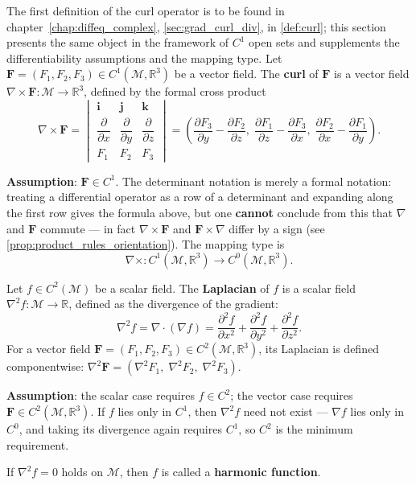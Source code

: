 \begin{definition}[Curl]\label{def:curl_vf}
The first definition of the curl operator is to be found in chapter~\ref{chap:diffeq_complex}, \cref{sec:grad_curl_div}, in \cref{def:curl}; this section presents the same object in the framework of $C^1$ open sets and supplements the differentiability assumptions and the mapping type.
Let $\mathbf{F} = (F_1, F_2, F_3) \in C^1(\mathcal{M}, \mathbb{R}^3)$ be a vector field. The \textbf{curl} of $\mathbf{F}$ is a vector field $\nabla \times \mathbf{F}: \mathcal{M} \to \mathbb{R}^3$, defined by the formal cross product
\[
\nabla \times \mathbf{F} = \begin{vmatrix}
\mathbf{i} & \mathbf{j} & \mathbf{k} \\[2pt]
\dfrac{\partial}{\partial x} & \dfrac{\partial}{\partial y} & \dfrac{\partial}{\partial z} \\[6pt]
F_1 & F_2 & F_3
\end{vmatrix}
= \left( \frac{\partial F_3}{\partial y} - \frac{\partial F_2}{\partial z},\;
\frac{\partial F_1}{\partial z} - \frac{\partial F_3}{\partial x},\;
\frac{\partial F_2}{\partial x} - \frac{\partial F_1}{\partial y} \right).
\]

\textbf{Assumption}: $\mathbf F\in C^1$. The determinant notation is merely a formal notation: treating a differential operator as a row of a determinant and expanding along the first row gives the formula above, but one \textbf{cannot} conclude from this that $\nabla$ and $\mathbf F$ commute --- in fact $\nabla\times\mathbf F$ and $\mathbf F\times\nabla$ differ by a sign (see \cref{prop:product_rules_orientation}). The mapping type is
\[
\nabla\times: C^1(\mathcal{M}, \mathbb{R}^3) \to C^0(\mathcal{M}, \mathbb{R}^3).
\]
\end{definition}

\begin{definition}\label{def:laplacian}
Let $f \in C^2(\mathcal{M})$ be a scalar field. The \textbf{Laplacian} of $f$ is a scalar field $\nabla^2 f: \mathcal{M} \to \mathbb{R}$, defined as the divergence of the gradient:
\[
\nabla^2 f = \nabla \cdot (\nabla f) = \frac{\partial^2 f}{\partial x^2} + \frac{\partial^2 f}{\partial y^2} + \frac{\partial^2 f}{\partial z^2}.
\]
For a vector field $\mathbf{F} = (F_1, F_2, F_3) \in C^2(\mathcal{M}, \mathbb{R}^3)$, its Laplacian is defined componentwise: $\nabla^2 \mathbf{F} = (\nabla^2 F_1,\; \nabla^2 F_2,\; \nabla^2 F_3)$.

\textbf{Assumption}: the scalar case requires $f\in C^2$; the vector case requires $\mathbf F\in C^2(\mathcal M,\mathbb R^3)$. If $f$ lies only in $C^1$, then $\nabla^2 f$ need not exist --- $\nabla f$ lies only in $C^0$, and taking its divergence again requires $C^1$, so $C^2$ is the minimum requirement.

If $\nabla^2 f = 0$ holds on $\mathcal{M}$, then $f$ is called a \textbf{harmonic function}.
\end{definition}

